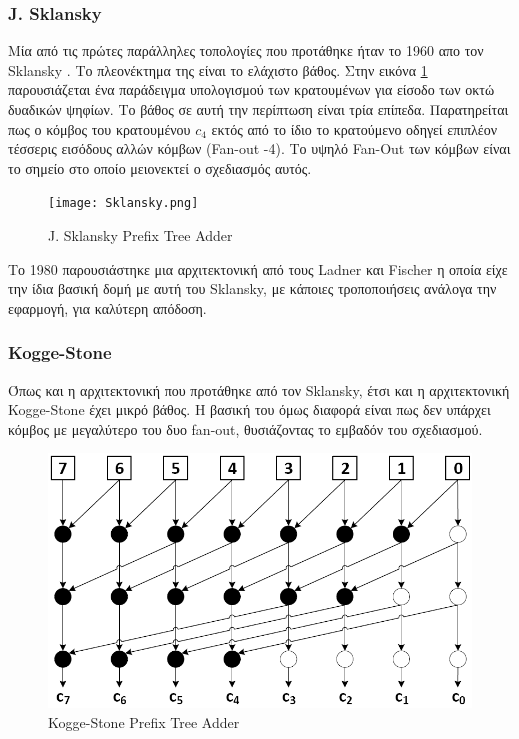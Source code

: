 \subsubsection*{J. Sklansky}
Μία από τις πρώτες παράλληλες τοπολογίες που προτάθηκε ήταν το 1960 απο τον Sklansky \cite{5219822}. Το πλεονέκτημα της είναι το ελάχιστο βάθος. Στην εικόνα \ref{SklanskyTree} παρουσιάζεται ένα παράδειγμα υπολογισμού των κρατουμένων για είσοδο των οκτώ δυαδικών ψηφίων. Το βάθος σε αυτή την περίπτωση είναι τρία επίπεδα. Παρατηρείται πως ο κόμβος του κρατουμένου $c_4$ εκτός από το ίδιο το κρατούμενο οδηγεί επιπλέον τέσσερις εισόδους αλλών κόμβων (Fan-out -4). Το υψηλό Fan-Out των κόμβων είναι το σημείο στο οποίο μειονεκτεί ο σχεδιασμός αυτός.
\begin{figure}[H]
    \centering
    \texttt{[image: Sklansky.png]}
    \caption{J. Sklansky Prefix Tree Adder}
    \label{SklanskyTree}
\end{figure}
Το 1980 παρουσιάστηκε μια αρχιτεκτονική από τους Ladner και Fischer 
\cite{Ladner:1980:PPC:322217.322232} η οποία είχε την ίδια βασική δομή με αυτή του
Sklansky, με κάποιες τροποποιήσεις ανάλογα την εφαρμογή, για καλύτερη απόδοση.





\subsubsection*{Kogge-Stone}
Όπως και η αρχιτεκτονική που προτάθηκε από τον Sklansky, έτσι και η αρχιτεκτονική
Kogge-Stone \cite{5009159} έχει μικρό βάθος. Η βασική του όμως διαφορά είναι πως δεν υπάρχει 
κόμβος με μεγαλύτερο του δυο fan-out, θυσιάζοντας το εμβαδόν του σχεδιασμού.
\begin{figure}[H]
    \centering
    \includegraphics[scale=0.45]{Pictures/Kogge-Stone.png}
    \caption{Kogge-Stone Prefix Tree Adder}
    \label{Kogge-StoneTree}
\end{figure}






